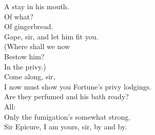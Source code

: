 \documentclass[a4paper,oneside,12pt]{memoir}
\begin{document}
\begin{drama*}
A stay in his mouth.\\
\subtlespeaks {} Of what?\\
\facespeaks {} Of gingerbread.\\
Gape, sir, and let him fit you.\\
\subtlespeaks {} (Where shall we now\\
Bestow him?\\
\dolspeaks {} In the privy.)\\
\subtlespeaks {} Come along, sir,\\
I now must show you Fortune's privy lodgings.\\
\facespeaks Are they perfumed and his bath ready?\\
\subtlespeaks {} All:\\
Only the fumigation's somewhat strong.\\
\facespeaks {}
Sir Epicure, I am yours, sir, by and by.\\

\pagebreak
\scene


\end{drama*}
\end{document}
